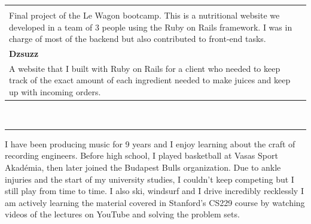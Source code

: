 \documentclass{article}
\begin{document}
\begin{tabular}{l l}
\begin{minipage}{120mm}
        \noindent
        \textbf{Nutri} \\
        Final project of the Le Wagon bootcamp. This is a nutritional website we developed in a team of 3 people using the Ruby on Rails framework. I was in charge of most of the backend but also contributed to front-end tasks.
        \smallskip \\

        \noindent
        \textbf{Dzsuzz} \\
        A website that I built with Ruby on Rails for a client who needed to keep track of the exact amount of each ingredient needed to make juices and keep up with incoming orders. 
    \end{minipage}
\end{tabular}

\vspace{5mm}
\noindent

 \\
\hrule
\bigskip

I have been producing music for 9 years and I enjoy learning about the craft of recording engineers. Before high school, I played basketball at Vasas Sport Akadémia, then later joined the Budapest Bulls organization. Due to ankle injuries and the start of my university studies, I couldn't keep competing but I still play from time to time. I also ski, windsurf and I drive incredibly recklessly
I am actively learning the material covered in Stanford's CS229 course by watching videos of the lectures on YouTube and solving the problem sets.
\end{document}
